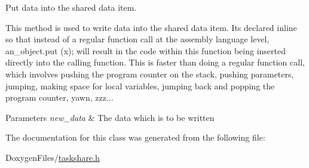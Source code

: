 Put data into the shared data item. 

This method is used to write data into the shared data item. It\textquotesingle{}s declared {\ttfamily inline} so that instead of a regular function call at the assembly language level, {\ttfamily an\+\_\+object.\+put (x);} will result in the code within this function being inserted directly into the calling function. This is faster than doing a regular function call, which involves pushing the program counter on the stack, pushing parameters, jumping, making space for local variables, jumping back and popping the program counter, yawn, zzz... 
\begin{DoxyParams}{Parameters}
{\em new\+\_\+data} & The data which is to be written \\
\hline
\end{DoxyParams}


The documentation for this class was generated from the following file\+:\begin{DoxyCompactItemize}
\item 
Doxygen\+Files/\mbox{\hyperlink{taskshare_8h}{taskshare.\+h}}\end{DoxyCompactItemize}
